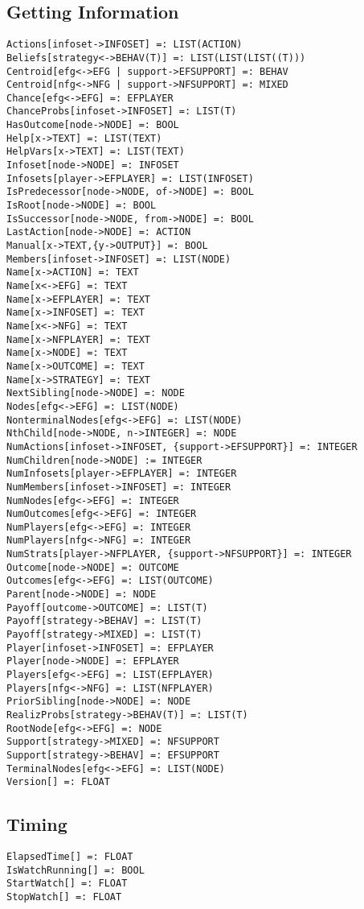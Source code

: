 \subsection{Getting Information}

\begin{verbatim}
Actions[infoset->INFOSET] =: LIST(ACTION)
Beliefs[strategy<->BEHAV(T)] =: LIST(LIST(LIST((T)))
Centroid[efg<->EFG | support->EFSUPPORT] =: BEHAV
Centroid[nfg<->NFG | support->NFSUPPORT] =: MIXED
Chance[efg<->EFG] =: EFPLAYER
ChanceProbs[infoset->INFOSET] =: LIST(T)
HasOutcome[node->NODE] =: BOOL
Help[x->TEXT] =: LIST(TEXT)
HelpVars[x->TEXT] =: LIST(TEXT)
Infoset[node->NODE] =: INFOSET
Infosets[player->EFPLAYER] =: LIST(INFOSET)
IsPredecessor[node->NODE, of->NODE] =: BOOL
IsRoot[node->NODE] =: BOOL
IsSuccessor[node->NODE, from->NODE] =: BOOL
LastAction[node->NODE] =: ACTION
Manual[x->TEXT,{y->OUTPUT}] =: BOOL
Members[infoset->INFOSET] =: LIST(NODE)
Name[x->ACTION] =: TEXT
Name[x<->EFG] =: TEXT
Name[x->EFPLAYER] =: TEXT
Name[x->INFOSET] =: TEXT
Name[x<->NFG] =: TEXT
Name[x->NFPLAYER] =: TEXT
Name[x->NODE] =: TEXT
Name[x->OUTCOME] =: TEXT
Name[x->STRATEGY] =: TEXT
NextSibling[node->NODE] =: NODE
Nodes[efg<->EFG] =: LIST(NODE)
NonterminalNodes[efg<->EFG] =: LIST(NODE)
NthChild[node->NODE, n->INTEGER] =: NODE
NumActions[infoset->INFOSET, {support->EFSUPPORT}] =: INTEGER
NumChildren[node->NODE] := INTEGER
NumInfosets[player->EFPLAYER] =: INTEGER
NumMembers[infoset->INFOSET] =: INTEGER
NumNodes[efg<->EFG] =: INTEGER
NumOutcomes[efg<->EFG] =: INTEGER
NumPlayers[efg<->EFG] =: INTEGER
NumPlayers[nfg<->NFG] =: INTEGER
NumStrats[player->NFPLAYER, {support->NFSUPPORT}] =: INTEGER
Outcome[node->NODE] =: OUTCOME
Outcomes[efg<->EFG] =: LIST(OUTCOME)
Parent[node->NODE] =: NODE
Payoff[outcome->OUTCOME] =: LIST(T)
Payoff[strategy->BEHAV] =: LIST(T)
Payoff[strategy->MIXED] =: LIST(T)
Player[infoset->INFOSET] =: EFPLAYER
Player[node->NODE] =: EFPLAYER
Players[efg<->EFG] =: LIST(EFPLAYER)
Players[nfg<->NFG] =: LIST(NFPLAYER)
PriorSibling[node->NODE] =: NODE
RealizProbs[strategy->BEHAV(T)] =: LIST(T)
RootNode[efg<->EFG] =: NODE
Support[strategy->MIXED] =: NFSUPPORT
Support[strategy->BEHAV] =: EFSUPPORT
TerminalNodes[efg<->EFG] =: LIST(NODE)
Version[] =: FLOAT
\end{verbatim}

\subsection{Timing}

\begin{verbatim}
ElapsedTime[] =: FLOAT
IsWatchRunning[] =: BOOL
StartWatch[] =: FLOAT
StopWatch[] =: FLOAT
\end{verbatim}


